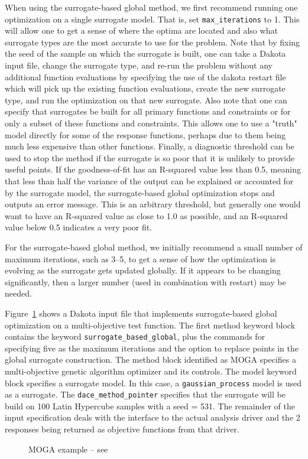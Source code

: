 When using the surrogate-based global method, we first recommend
running one optimization on a single surrogate model. That is, set
\texttt{max\_iterations} to 1.  This will allow one to get a sense of
where the optima are located and also what surrogate types are the
most accurate to use for the problem.  Note that by fixing the seed of
the sample on which the surrogate is built, one can take a Dakota
input file, change the surrogate type, and re-run the problem without
any additional function evaluations by specifying the use of the
dakota restart file which will pick up the existing function
evaluations, create the new surrogate type, and run the optimization
on that new surrogate.  Also note that one can specify that surrogates
be built for all primary functions and constraints or for only a
subset of these functions and constraints.  This allows one to use a
"truth" model directly for some of the response functions, perhaps due
to them being much less expensive than other functions.  Finally, a
diagnostic threshold can be used to stop the method if the surrogate
is so poor that it is unlikely to provide useful points.  If the
goodness-of-fit has an R-squared value less than 0.5, meaning that
less than half the variance of the output can be explained or
accounted for by the surrogate model, the surrogate-based global
optimization stops and outputs an error message.  This is an arbitrary
threshold, but generally one would want to have an R-squared value as
close to 1.0 as possible, and an R-squared value below 0.5 indicates a
very poor fit.

For the surrogate-based global method, we initially recommend a small
number of maximum iterations, such as 3--5, to get a sense of how the
optimization is evolving as the surrogate gets updated globally.  If
it appears to be changing significantly, then a larger number (used in
combination with restart) may be needed.

Figure~\ref{sbm:sbgm_moga} shows a Dakota input file that implements
surrogate-based global optimization on a multi-objective test function. 
The first method keyword block contains the
keyword \texttt{surrogate\_based\_global}, plus the commands for
specifying five as the maximum iterations and the option to replace 
points in the global surrogate construction. The method block identified 
as MOGA specifies a multi-objective genetic algorithm optimizer and its 
controls.  The model keyword block specifies a surrogate model.  
In this case, a \texttt{gaussian\_process} model is used as a surrogate. 
The \texttt{dace\_method\_pointer} specifies that the surrogate will be 
build on 100 Latin Hypercube samples with a seed = 531.
The remainder of the input specification deals with the interface 
to the actual analysis driver and the 2 responses being returned 
as objective functions from that driver. 

\begin{figure}
  \begin{bigbox}
    \begin{scriptsize}
    \end{scriptsize}
  \end{bigbox}
  \caption{MOGA example -- 
see \protect{} }
  \label{sbm:sbgm_moga}
\end{figure}
